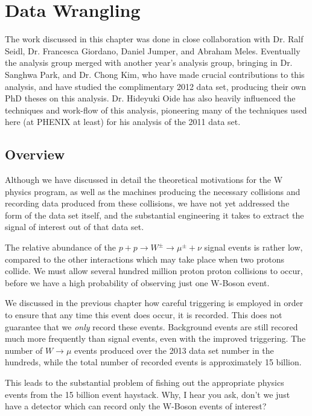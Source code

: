 \chapter{Data Wrangling}
\label{ch:data_wrangling}
The work discussed in this chapter was done in close collaboration with Dr. Ralf
Seidl, Dr. Francesca Giordano, Daniel Jumper, and Abraham Meles. Eventually the
analysis group merged with another year's analysis group, bringing in Dr. Sanghwa
Park, and Dr. Chong Kim, who have made crucial contributions to this analysis,
and have studied the complimentary 2012 data set, producing their own PhD theses
on this analysis. Dr. Hideyuki Oide has also heavily influenced the techniques
and work-flow of this analysis, pioneering many of the techniques used here (at
PHENIX at least) for his analysis of the 2011 data set.

\label{ch:data_collection}
\section{Overview}
Although we have discussed in detail the theoretical motivations for the W
physics program, as well as the machines producing the necessary collisions and
recording data produced from these collisions, we have not yet addressed the
form of the data set itself, and the substantial engineering it takes to extract
the signal of interest out of that data set.

The relative abundance of the $p + p \rightarrow W^\pm \rightarrow \mu^\pm +
\nu$ signal events is rather low, compared to the other interactions which may
take place when two protons collide. We must allow several hundred million
proton proton collisions to occur, before we have a high probability of
observing just one W-Boson event. 

We discussed in the previous chapter how careful triggering is employed in order
to ensure that any time this event does occur, it is recorded. This does not
guarantee that we \textit{only} record these events. Background events are still
recored much more frequently than signal events, even with the improved
triggering. The number of $W\rightarrow\mu$ events produced over the 2013 data
set number in the hundreds, while the total number of recorded events is
approximately 15 billion.

This leads to the substantial problem of fishing out the appropriate physics
events from the 15 billion event haystack. Why, I hear you ask, don't we just
have a detector which can record only the W-Boson events of interest?

